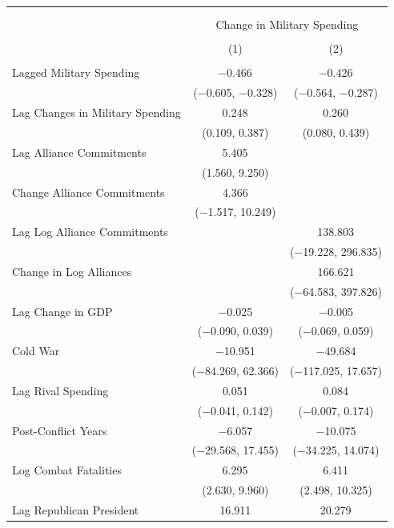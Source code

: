 \documentclass[12pt]{article}
\begin{document}
\begin{table}[!htbp] \centering  
\begin{adjustbox}{width= .95\textwidth, center}
\begin{tabular}{@{\extracolsep{5pt}}lcc} 
\\[-1.8ex]\hline \\[-1.8ex] 
\\[-1.8ex] & \multicolumn{2}{c}{Change in Military Spending} \\ 
\\[-1.8ex] & (1) & (2)\\ 
\hline \\[-1.8ex] 
 Lagged Military Spending & $-$0.466$^{}$ & $-$0.426$^{}$ \\ 
  & ($-$0.605, $-$0.328) & ($-$0.564, $-$0.287) \\ 
  Lag Changes in Military Spending & 0.248$^{}$ & 0.260$^{}$ \\ 
  & (0.109, 0.387) & (0.080, 0.439) \\ 
  Lag Alliance Commitments & 5.405$^{}$ &  \\ 
  & (1.560, 9.250) &  \\ 
  Change Alliance Commitments & 4.366 &  \\ 
  & ($-$1.517, 10.249) &  \\ 
  Lag Log Alliance Commitments &  & 138.803$^{}$ \\ 
  &  & ($-$19.228, 296.835) \\ 
  Change in Log Alliances &  & 166.621 \\ 
  &  & ($-$64.583, 397.826) \\ 
  Lag Change in GDP & $-$0.025 & $-$0.005 \\ 
  & ($-$0.090, 0.039) & ($-$0.069, 0.059) \\ 
  Cold War & $-$10.951 & $-$49.684 \\ 
  & ($-$84.269, 62.366) & ($-$117.025, 17.657) \\ 
  Lag Rival Spending & 0.051 & 0.084$^{}$ \\ 
  & ($-$0.041, 0.142) & ($-$0.007, 0.174) \\ 
  Post-Conflict Years & $-$6.057 & $-$10.075 \\ 
  & ($-$29.568, 17.455) & ($-$34.225, 14.074) \\ 
  Log Combat Fatalities & 6.295$^{}$ & 6.411$^{}$ \\ 
  & (2.630, 9.960) & (2.498, 10.325) \\ 
  Lag Republican President & 16.911 & 20.279$^{}$ \\ 

\end{tabular}
\end{adjustbox}
\end{table}
\end{document}

